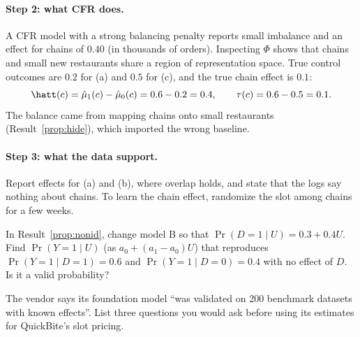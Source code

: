 \documentclass[11pt]{article}
\begin{document}
\paragraph{Step 2: what CFR does.} A CFR model with a strong balancing penalty reports small imbalance and an effect for
chains of $0.40$ (in thousands of orders). Inspecting $\Phi$ shows that chains and small new restaurants share a region of
representation space. True control outcomes are $0.2$ for (a) and $0.5$ for (c), and the true chain effect is $0.1$:
\[
  \hatt(c) = \hat\mu_1(c) - \hat\mu_0(c) = 0.6 - 0.2 = 0.4, \qquad \tau(c) = 0.6 - 0.5 = 0.1 .
\]
The balance came from mapping chains onto small restaurants (Result~\ref{prop:hide}), which imported the wrong
baseline.

\paragraph{Step 3: what the data support.} Report effects for (a) and (b), where overlap holds, and state that the logs say
nothing about chains. To learn the chain effect, randomize the slot among chains for a few weeks.

\begin{exercise}[computation]
In Result~\ref{prop:nonid}, change model B so that $\Pr(D=1 \mid U) = 0.3 + 0.4U$. Find $\Pr(Y=1 \mid U)$ (as $a_0 + (a_1 - a_0)U$)
that reproduces $\Pr(Y=1 \mid D=1) = 0.6$ and $\Pr(Y=1 \mid D=0) = 0.4$ with no effect of $D$. Is it a valid probability?
\end{exercise}

\begin{exercise}[judgment]
The vendor says its foundation model ``was validated on 200 benchmark datasets with known effects''. List three
questions you would ask before using its estimates for QuickBite's slot pricing.
\end{exercise}
\end{document}
